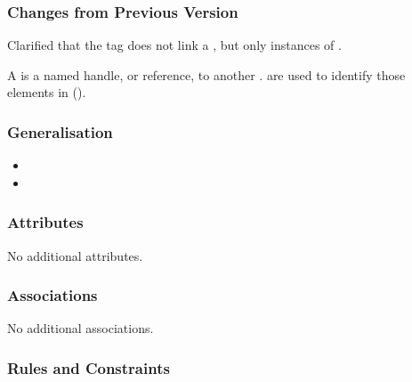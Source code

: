 \subsubsection{Changes from Previous Version}

Clarified that the tag does not link a , but
only instances of .

\label{defn:Tag}

A  is a named handle, or reference, to another .   are used to identify those elements in  ().

\subsubsection{Generalisation}

\begin{itemize}
\item {}
\item {}
\end{itemize}

\subsubsection{Attributes}

No additional attributes.

\subsubsection{Associations}

No additional associations.

\subsubsection{Rules and Constraints}

\begin{valrules}
\end{valrules}


